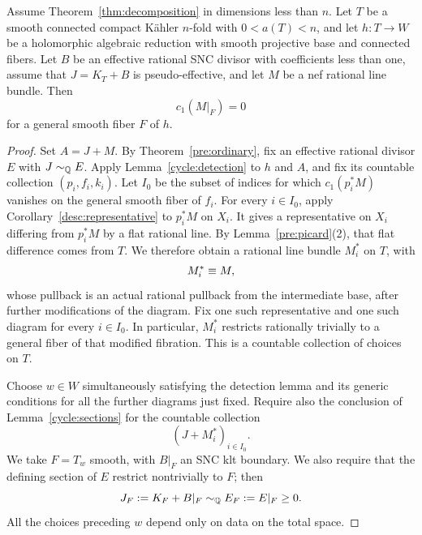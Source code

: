 \begin{proposition}\label{cycle:nef-summand}
Assume Theorem~\ref{thm:decomposition} in dimensions less than $n$.
Let $T$ be a smooth connected compact K\"ahler $n$-fold with
$0<a(T)<n$, and let $h:T\to W$ be a holomorphic algebraic reduction
with smooth projective base and connected fibers.  Let $B$ be an
effective rational SNC divisor with coefficients less than one,
assume that $J=K_T+B$ is pseudo-effective, and let $M$ be a nef
rational line bundle.  Then
\[
                              c_1(M|_F)=0
\]
for a general smooth fiber $F$ of $h$.
\end{proposition}

\begin{proof}
Set $A=J+M$.  By Theorem~\ref{pre:ordinary}, fix an effective rational
divisor $E$ with $J\sim_{\mathbb Q} E$.  Apply Lemma~\ref{cycle:detection} to $h$
and $A$, and
fix its countable collection $(p_i,f_i,k_i)$.  Let $I_0$ be the subset
of indices for which $c_1(p_i^*M)$ vanishes on the general smooth
fiber of $f_i$.  For every $i\in I_0$, apply
Corollary~\ref{desc:representative} to $p_i^*M$ on $X_i$.  It gives a
representative on $X_i$ differing from $p_i^*M$ by a flat rational
line.  By Lemma~\ref{pre:picard}(2), that flat difference comes from
$T$.  We therefore obtain a rational line bundle $M_i^*$ on $T$, with
\[
                              M_i^*\equiv M,
\]
whose pullback is an actual rational pullback from the intermediate
base, after further modifications of the diagram.  Fix one such
representative and one such diagram for every $i\in I_0$.  In
particular, $M_i^*$ restricts rationally trivially to a general fiber
of that modified fibration.  This is a countable collection of
choices on $T$.

Choose $w\in W$ simultaneously satisfying the detection lemma and
its generic conditions for all the further diagrams just fixed.
Require also the conclusion of Lemma~\ref{cycle:sections} for the
countable collection
\[
                              (J+M_i^*)_{i\in I_0}.
\]
We take $F=T_w$ smooth, with $B|_F$ an SNC klt boundary.
We also require that the defining section of $E$ restrict
nontrivially to $F$; then
\[
                       J_F:=K_F+B|_F\sim_{\mathbb Q} E_F:=E|_F\geq0.
\]
All the choices preceding $w$ depend only on data on the total space.


\end{proof}
